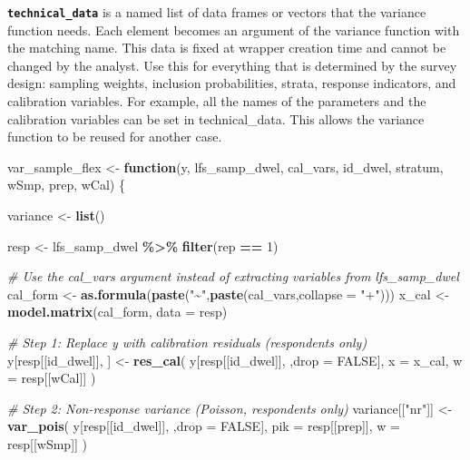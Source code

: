 \documentclass[
]{article}
\newenvironment{Shaded}{\begin{snugshade}}{\end{snugshade}}
\newcommand{\AttributeTok}[1]{\textcolor[rgb]{0.13,0.29,0.53}{#1}}
\newcommand{\CommentTok}[1]{\textcolor[rgb]{0.56,0.35,0.01}{\textit{#1}}}
\newcommand{\ConstantTok}[1]{\textcolor[rgb]{0.56,0.35,0.01}{#1}}
\newcommand{\ControlFlowTok}[1]{\textcolor[rgb]{0.13,0.29,0.53}{\textbf{#1}}}
\newcommand{\DecValTok}[1]{\textcolor[rgb]{0.00,0.00,0.81}{#1}}
\newcommand{\FunctionTok}[1]{\textcolor[rgb]{0.13,0.29,0.53}{\textbf{#1}}}
\newcommand{\NormalTok}[1]{#1}
\newcommand{\OtherTok}[1]{\textcolor[rgb]{0.56,0.35,0.01}{#1}}
\newcommand{\SpecialCharTok}[1]{\textcolor[rgb]{0.81,0.36,0.00}{\textbf{#1}}}
\newcommand{\StringTok}[1]{\textcolor[rgb]{0.31,0.60,0.02}{#1}}
\begin{document}
\textbf{\texttt{technical\_data}} is a named list of data frames or
vectors that the variance function needs. Each element becomes an
argument of the variance function with the matching name. This data is
fixed at wrapper creation time and cannot be changed by the analyst. Use
this for everything that is determined by the survey design: sampling
weights, inclusion probabilities, strata, response indicators, and
calibration variables. For example, all the names of the parameters and
the calibration variables can be set in technical\_data. This allows the
variance function to be reused for another case.

\begin{Shaded}
\begin{Highlighting}[]
\NormalTok{var\_sample\_flex }\OtherTok{\textless{}{-}} \ControlFlowTok{function}\NormalTok{(y, lfs\_samp\_dwel, cal\_vars, id\_dwel, stratum, }
\NormalTok{                            wSmp, prep, wCal) \{}
  
\NormalTok{  variance }\OtherTok{\textless{}{-}} \FunctionTok{list}\NormalTok{()}
  
\NormalTok{  resp }\OtherTok{\textless{}{-}}\NormalTok{ lfs\_samp\_dwel }\SpecialCharTok{\%\textgreater{}\%} \FunctionTok{filter}\NormalTok{(rep }\SpecialCharTok{==} \DecValTok{1}\NormalTok{)}
  
  \CommentTok{\# Use the cal\_vars argument instead of extracting variables from lfs\_samp\_dwel}
\NormalTok{  cal\_form }\OtherTok{\textless{}{-}} \FunctionTok{as.formula}\NormalTok{(}\FunctionTok{paste}\NormalTok{(}\StringTok{"\textasciitilde{}"}\NormalTok{,}\FunctionTok{paste}\NormalTok{(cal\_vars,}\AttributeTok{collapse =} \StringTok{"+"}\NormalTok{)))}
\NormalTok{  x\_cal }\OtherTok{\textless{}{-}} \FunctionTok{model.matrix}\NormalTok{(cal\_form, }\AttributeTok{data =}\NormalTok{ resp)}
  
  \CommentTok{\# Step 1: Replace y with calibration residuals (respondents only)}
\NormalTok{  y[resp[[id\_dwel]], ] }\OtherTok{\textless{}{-}} \FunctionTok{res\_cal}\NormalTok{(}
\NormalTok{    y[resp[[id\_dwel]], ,}\AttributeTok{drop =} \ConstantTok{FALSE}\NormalTok{],}
    \AttributeTok{x =}\NormalTok{ x\_cal,}
    \AttributeTok{w =}\NormalTok{ resp[[wCal]]}
\NormalTok{  )}
  
  \CommentTok{\# Step 2: Non{-}response variance (Poisson, respondents only)}
\NormalTok{  variance[[}\StringTok{"nr"}\NormalTok{]] }\OtherTok{\textless{}{-}} \FunctionTok{var\_pois}\NormalTok{(}
\NormalTok{    y[resp[[id\_dwel]], ,}\AttributeTok{drop =} \ConstantTok{FALSE}\NormalTok{],}
    \AttributeTok{pik =}\NormalTok{ resp[[prep]],}
    \AttributeTok{w   =}\NormalTok{ resp[[wSmp]]}
\NormalTok{  )}
  

\end{Highlighting}
\end{Shaded}
\end{document}
